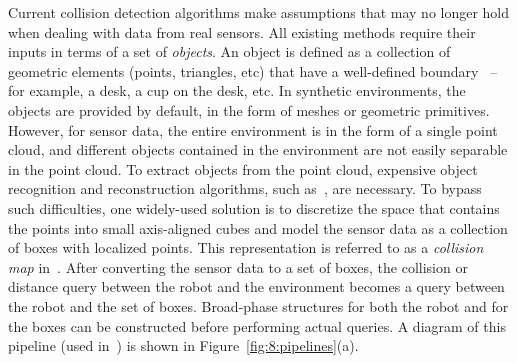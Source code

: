 Current collision detection algorithms make assumptions that may no
longer hold when dealing with data from real sensors.
All existing methods require their inputs in terms of a set of \emph{objects}.
An object is defined as a collection of geometric elements (points, triangles,
etc) that have a well-defined boundary~\cite{Alexe:2010:CVPR} -- for
example, a desk, a cup on the desk, etc.  In synthetic environments,
the objects are provided by default, in the form of meshes or
geometric primitives. However, for sensor data, the entire environment
is in the form of a single point cloud, and different objects
contained in the environment are not easily separable in the point
cloud. To extract objects from the point cloud, expensive object
recognition and reconstruction algorithms, such
as~\cite{Muja:2011:ICRA}, are necessary. To bypass such difficulties,
one widely-used solution is to discretize the space that contains the points into small axis-aligned cubes and model the sensor data as a collection of boxes with localized points. This representation is referred to as
a \emph{collision map} in~\cite{Rusu:RPG:2009,Ioan:2010}. After
converting the sensor data to a set of boxes, the collision or
distance query between the robot and the environment becomes a query
between the robot and the set of boxes. Broad-phase structures for
both the robot and for the boxes can be constructed before performing
actual queries.  A diagram of this pipeline (used in~\cite{Rusu:RPG:2009,Ioan:2010}) is shown in
Figure~\ref{fig:8:pipelines}(a).

